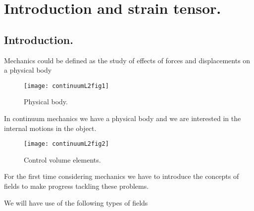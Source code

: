 %
%

\chapter{Introduction and strain tensor.}
\label{chap:continuumL2}
{}
\date{Jan 13, 2012}

\beginArtWithToc

%

\section{Introduction.}

Mechanics could be defined as the study of effects of forces and displacements on a physical body

\begin{figure}[htp]
   \centering
   \texttt{[image: continuumL2fig1]}
   \caption{Physical body.}\label{fig:continuumL2:continuumL2fig1}
\end{figure}

In continuum mechanics we have a physical body and we are interested in the internal motions in the object.  

\begin{figure}[htp]
   \centering
   \texttt{[image: continuumL2fig2]}
   \caption{Control volume elements.}\label{fig:continuumL2:continuumL2fig2}
\end{figure}

For the first time considering mechanics we have to introduce the concepts of fields to make progress tackling these problems.

We will have use of the following types of fields

